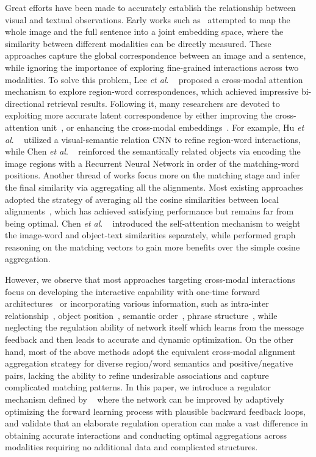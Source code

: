 \documentclass[journal]{IEEEtran}\newcommand{\ignore}[1]{}
\newcommand{\etal}{\textit{et al}. }
\begin{document}
Great efforts have been made to accurately establish the relationship between visual and textual observations. Early works such as~\cite{DSPE,VSE++,DAN,SCO,GXN,PVSE,SAEM,VSRN,SGM,CVSE,GPO} attempted to map the whole image and the full sentence into a joint embedding space, where the similarity between different modalities can be directly measured. These approaches capture the global correspondence between an image and a sentence, while ignoring the importance of exploring fine-grained interactions across two modalities. 
To solve this problem, Lee \etal~\cite{SCAN} proposed a cross-modal attention mechanism to explore region-word correspondences, which achieved impressive bi-directional retrieval results. Following it, many researchers are devoted to exploiting more accurate latent correspondence by either improving the cross-attention unit~\cite{BFAN,MMCA,RDAN}, or enhancing the cross-modal embeddings~\cite{PFAN,DP-RNN,ACME,CAAN,IMRAM}. For example, Hu \etal~\cite{RDAN} utilized a visual-semantic relation CNN to refine region-word interactions, while Chen \etal~\cite{DP-RNN} reinforced the semantically related objects via encoding the image regions with a Recurrent Neural Network in order of the matching-word positions.
Another thread of works focus more on the matching stage and infer the final similarity via aggregating all the alignments. Most existing approaches adopted the strategy of averaging all the cosine similarities between local alignments~\cite{SCAN, PFAN, BFAN, RDAN, IMRAM}, which has achieved satisfying performance but remains far from being optimal. Chen \etal~\cite{DP-RNN} introduced the self-attention mechanism to weight the image-word and object-text similarities separately, while \cite{GSMN,SGRAF} performed graph reasoning on the matching vectors to gain more benefits over the simple cosine aggregation.

However, we observe that most approaches targeting cross-modal interactions focus on developing the interactive capability with one-time forward architectures~\cite{RDAN,BFAN} or incorporating various information, such as intra-inter relationship~\cite{sm-LSTM,CAMP,MMCA,CAAN}, object position~\cite{PFAN,GSMN}, semantic order~\cite{DP-RNN}, phrase structure~\cite{R-SCAN,GSMN}, while neglecting the regulation ability of network itself which learns from the message feedback and then leads to accurate and dynamic optimization. On the other hand, most of the above methods adopt the equivalent cross-modal alignment aggregation strategy for diverse region/word semantics and positive/negative pairs, lacking the ability to refine undesirable associations and capture complicated matching patterns. In this paper, we introduce a regulator mechanism defined by ~\cite{Black-Box,RegNet,AdaFR,Feedpixel} where the network can be improved by adaptively optimizing the forward learning process with plausible backward feedback loops, and validate that an elaborate regulation operation can make a vast difference in obtaining accurate interactions and conducting optimal aggregations across modalities requiring no additional data and complicated structures.
\end{document}
